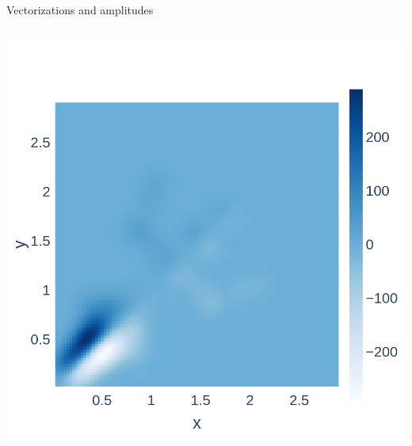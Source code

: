 \begin{frame}{Vectorizations and amplitudes}
\begin{columns}
\begin{column}{0.6\linewidth}
{	\includegraphics[height=0.35\textheight]{img/HK3.png}
}
\\
\\
\end{column}
\end{columns}
\end{frame}

